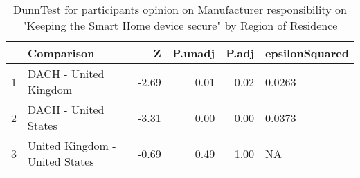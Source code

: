 \begin{table}[ht]
\centering
\begin{tabular}{rlrrrl}
  \hline
 & Comparison & Z & P.unadj & P.adj & epsilonSquared \\ 
  \hline
1 & DACH - United Kingdom & -2.69 & 0.01 & 0.02 & 0.0263 \\ 
  2 & DACH - United States & -3.31 & 0.00 & 0.00 & 0.0373 \\ 
  3 & United Kingdom - United States & -0.69 & 0.49 & 1.00 & NA \\ 
   \hline
\end{tabular}
\caption{DunnTest for participants opinion on Manufacturer responsibility on "Keeping the Smart Home device secure" by Region of Residence} 
\end{table}
